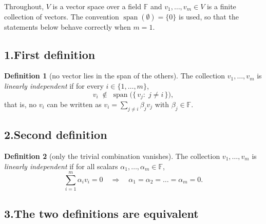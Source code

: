 \documentclass[11pt]{article}
\DeclareMathOperator{\spn}{span}
\theoremstyle{definition}\newtheorem*{definition}{Definition}
\theoremstyle{definition}
\begin{document}
Throughout, $V$ is a vector space over a field $\mathbb{F}$ and
$v_1,\dots,v_m \in V$ is a finite collection of vectors. The convention
$\spn(\emptyset) = \{0\}$ is used, so that the statements below behave
correctly when $m = 1$.

\subsection*{1.\quad First definition}

\begin{definition}[no vector lies in the span of the others]
The collection $v_1,\dots,v_m$ is \emph{linearly independent} if for
every $i \in \{1,\dots,m\}$,
\[
  v_i \;\notin\; \spn\big(\{\, v_j :\; j \ne i \,\}\big),
\]
that is, no $v_i$ can be written as
$v_i = \sum_{j \ne i} \beta_j v_j$ with $\beta_j \in \mathbb{F}$.
\end{definition}

\subsection*{2.\quad Second definition}

\begin{definition}[only the trivial combination vanishes]
The collection $v_1,\dots,v_m$ is \emph{linearly independent} if for all
scalars $\alpha_1,\dots,\alpha_m \in \mathbb{F}$,
\[
  \sum_{i=1}^{m} \alpha_i v_i = 0
  \quad\Longrightarrow\quad
  \alpha_1 = \alpha_2 = \dots = \alpha_m = 0 .
\]
\end{definition}

\subsection*{3.\quad The two definitions are equivalent}
\end{document}
